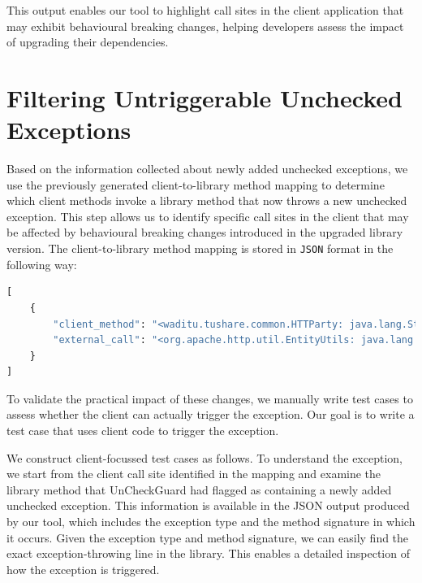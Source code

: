 
This output enables our tool to highlight call sites in the client application that may exhibit behavioural breaking changes, helping developers assess the impact of upgrading their dependencies.

\section{Filtering Untriggerable Unchecked Exceptions}

Based on the information collected about newly added unchecked exceptions, we use the previously generated client-to-library method mapping to determine which client methods invoke a library method that now throws a new unchecked exception. This step allows us to identify specific call sites in the client that may be affected by behavioural breaking changes introduced in the upgraded library version. The client-to-library method mapping is stored in \texttt{JSON} format in the following way:

\begin{lstlisting}[language=python]
[
    {
        "client_method": "<waditu.tushare.common.HTTParty: java.lang.String get(java.lang.String,java.lang.String)>",
        "external_call": "<org.apache.http.util.EntityUtils: java.lang.String toString(org.apache.http.HttpEntity,java.lang.String)>"
    }
]
\end{lstlisting}

To validate the practical impact of these changes, we manually write test cases to assess whether the client can actually trigger the exception. Our goal is to write a test case that uses client code to trigger the exception.

We construct client-focussed test cases as follows. To understand the exception, we start from the client call site identified in the mapping and examine the library method that UnCheckGuard had flagged as containing a newly added unchecked exception. This information is available in the JSON output produced by our tool, which includes the exception type and the method signature in which it occurs. Given the exception type and method signature, we can easily find the exact exception-throwing line in the library. This enables a detailed inspection of how the exception is triggered.

